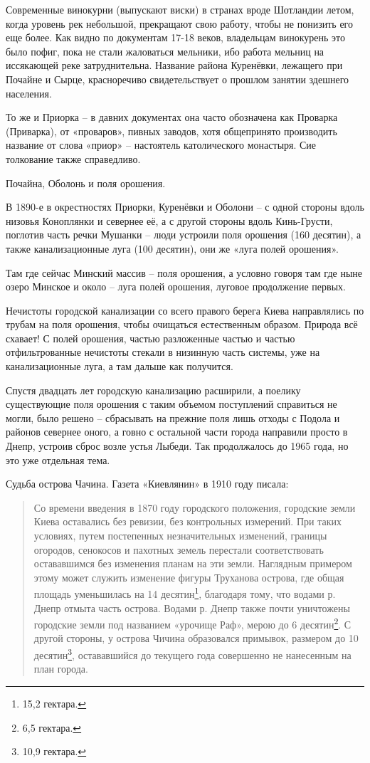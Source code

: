 Современные винокурни (выпускают виски) в странах вроде Шотландии летом, когда уровень рек небольшой, прекращают свою работу, чтобы не понизить его еще более. Как видно по документам 17-18 веков, владельцам винокурень это было пофиг, пока не стали жаловаться мельники, ибо работа мельниц на иссякающей реке затруднительна. Название района Куренёвки, лежащего при Почайне и Сырце, красноречиво свидетельствует о прошлом занятии здешнего населения.

То же и Приорка – в давних документах она часто обозначена как Проварка (Приварка), от «проваров», пивных заводов, хотя общепринято производить название от слова «приор» – настоятель католического монастыря. Сие толкование также справедливо.

Почайна, Оболонь и поля орошения.

В 1890-е в окрестностях Приорки, Куренёвки и Оболони – с одной стороны вдоль низовья Коноплянки и севернее её, а с другой стороны вдоль Кинь-Грусти, поглотив часть речки Мушанки – люди устроили поля орошения (160 десятин), а также канализационные луга (100 десятин), они же «луга полей орошения». 

Там где сейчас Минский массив – поля орошения, а условно говоря там где ныне озеро Минское и около – луга полей орошения, луговое продолжение первых.

Нечистоты городской канализации со всего правого берега Киева направлялись по трубам на поля орошения, чтобы очищаться естественным образом. Природа всё схавает! С полей орошения, частью разложенные частью и частью отфильтрованные нечистоты стекали в низинную часть системы, уже на канализационные луга, а там дальше как получится.

Спустя двадцать лет городскую канализацию расширили, а поелику существующие поля орошения с таким объемом поступлений справиться не могли, было решено – сбрасывать на прежние поля лишь отходы с Подола и районов севернее оного, а говно с остальной части города направили просто в Днепр, устроив сброс возле устья Лыбеди. Так продолжалось до 1965 года, но это уже отдельная тема.

Судьба острова Чачина. Газета «Киевлянин» в 1910 году писала:

\begin{quotation}
Со времени введения в 1870 году городского положения, городские земли Киева оставались без ревизии, без контрольных измерений. При таких условиях, путем постепенных незначительных изменений, границы огородов, сенокосов и пахотных земель перестали соответствовать остававшимся без изменения планам на эти земли. Наглядным примером этому может служить изменение фигуры Труханова острова, где общая площадь уменьшилась на 14 десятин\footnote{15,2 гектара.}, благодаря тому, что водами р. Днепр отмыта часть острова. Водами р. Днепр также почти уничтожены городские земли под названием «урочище Раф», мерою до 6 десятин\footnote{6,5 гектара.}. С другой стороны, у острова Чичина образовался примывок, размером до 10 десятин\footnote{10,9 гектара.}, остававшийся до текущего года совершенно не нанесенным на план города. 
\end{quotation}

